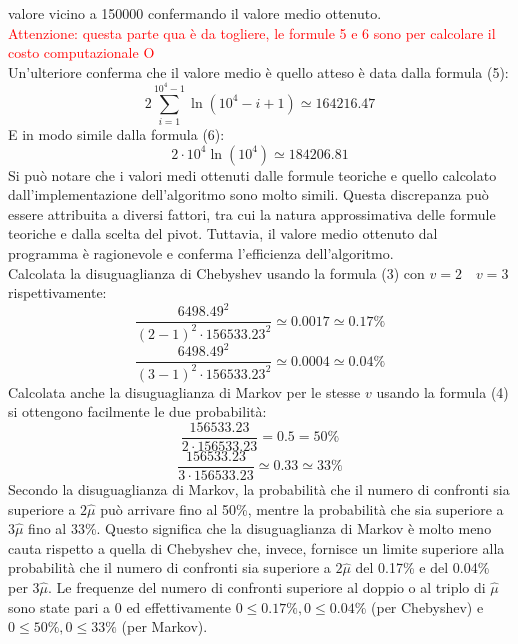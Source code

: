 \documentclass[12pt]{article}
\begin{document}
valore vicino a 150000 confermando il valore medio ottenuto.
\\\textcolor{red}{Attenzione: questa parte qua è da togliere, le formule 5 e 6 sono per calcolare il costo computazionale O}
\\Un'ulteriore conferma che il valore medio è quello atteso è data dalla 
formula (5):
\begin{equation*}
    2\sum_{i=1}^{10^{4}-1}\ln(10^{4}-i+1) \simeq 164216.47
\end{equation*}
E in modo simile dalla formula (6):
\begin{equation*}
     2\cdot 10^{4}\ln(10^{4}) \simeq 184206.81
\end{equation*}
Si può notare che i valori medi ottenuti dalle formule teoriche e quello
calcolato dall'implementazione dell'algoritmo sono molto simili.
Questa discrepanza può essere attribuita a diversi fattori, tra cui la natura
approssimativa delle formule teoriche e dalla scelta del pivot. Tuttavia,
il valore medio ottenuto dal programma è ragionevole e conferma l'efficienza
dell'algoritmo.\\
Calcolata la disuguaglianza di Chebyshev usando la formula (3)
con $v=2 \quad v=3$ rispettivamente:
\begin{equation*}
    \frac{6498.49^{2}}{(2-1)^{2}\cdot 156533.23^{2}} \simeq 0.0017 
    \simeq 0.17\%
\end{equation*}
\begin{equation*}
    \frac{6498.49^{2}}{(3-1)^{2}\cdot 156533.23^{2}} \simeq 0.0004 
    \simeq 0.04\%
\end{equation*}
Calcolata anche la disuguaglianza di Markov per le stesse $v$ usando la
formula (4) si ottengono facilmente le due probabilità:
\begin{equation*}
    \frac{156533.23}{2\cdot 156533.23} = 0.5 = 50\%
\end{equation*}
\begin{equation*}
    \frac{156533.23}{3\cdot 156533.23} \simeq 0.33 \simeq 33\%
\end{equation*}
Secondo la disuguaglianza di Markov, la probabilità che il numero di 
confronti sia superiore a $2\hat{\mu}$ può arrivare fino al 50\%, mentre 
la probabilità che sia superiore a $3\hat{\mu}$ fino al 33\%. Questo 
significa che la disuguaglianza di Markov è molto meno cauta rispetto a 
quella di Chebyshev che, invece, fornisce un limite superiore alla 
probabilità che il numero di confronti sia superiore a $2\hat{\mu}$ del 
0.17\% e del 0.04\% per $3\hat{\mu}$.
Le frequenze del numero di confronti superiore al doppio o al triplo di 
$\hat{\mu}$ sono state pari a 0 ed effettivamente 
$0\leq 0.17\%,0\leq 0.04\%$ (per Chebyshev) e $0\leq 50\%,0\leq 33\%$ 
(per Markov).
\end{document}
